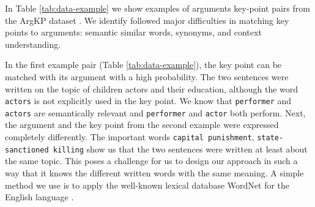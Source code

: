 
In Table \ref{tab:data-example} we show examples of arguments key-point pairs from the ArgKP dataset \cite{Bar-HaimEFKLS2020}. 
We identify followed major difficulties in matching key points to arguments: semantic similar words, synonyms, and context understanding.

In the first example pair (Table \ref{tab:data-example}), the key point can be matched with its argument with a high probability. 
The two sentences were written on the topic of children actors and their education, although the word \texttt{actors} is not explicitly used in the key point. 
We know that \texttt{performer} and \texttt{actors} are semantically relevant and \texttt{performer} and \texttt{actor} both perform. Next, the argument and the key point from the second example were expressed completely differently. 
The important words \texttt{capital punishment}, \texttt{state-sanctioned killing} show us that the two sentences were written at least about the same topic. 
This poses a challenge for us to design our approach in such a way that it knows the different written words with the same meaning. 
A simple method we use is to apply the well-known lexical database WordNet for the English language \cite{Miller1995}.


